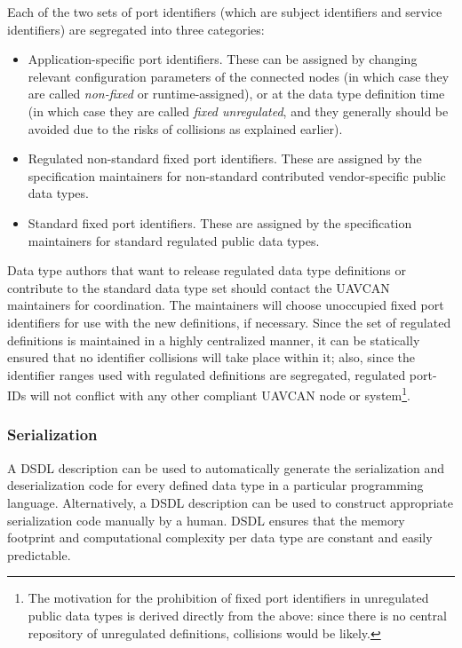Each of the two sets of port identifiers (which are subject identifiers and service identifiers) are
segregated into three categories:

\begin{itemize}
    \item Application-specific port identifiers.
    These can be assigned by changing relevant configuration parameters of the connected nodes
    (in which case they are called \emph{non-fixed} or runtime-assigned),
    or at the data type definition time (in which case they are called \emph{fixed unregulated},
    and they generally should be avoided due to the risks of collisions as explained earlier).

    \item Regulated non-standard fixed port identifiers.
    These are assigned by the specification maintainers for non-standard contributed
    vendor-specific public data types.

    \item Standard fixed port identifiers. These are assigned by the specification maintainers
    for standard regulated public data types.
\end{itemize}

Data type authors that want to release regulated data type definitions or contribute to the standard data
type set should contact the UAVCAN maintainers for coordination.
The maintainers will choose unoccupied fixed port identifiers for use with the new definitions, if necessary.
Since the set of regulated definitions is maintained in a highly centralized manner,
it can be statically ensured that no identifier collisions will take place within it;
also, since the identifier ranges used with regulated definitions are segregated,
regulated port-IDs will not conflict with any other compliant UAVCAN node or system\footnote{%
    The motivation for the prohibition of fixed port identifiers in unregulated public data types is
    derived directly from the above: since there is no central repository of unregulated definitions,
    collisions would be likely.
}.

\subsubsection{Serialization}

A DSDL description can be used to automatically generate the serialization and deserialization code
for every defined data type in a particular programming language.
Alternatively, a DSDL description can be used to construct appropriate serialization code manually by a human.
DSDL ensures that the memory footprint and computational complexity per data type
are constant and easily predictable.

